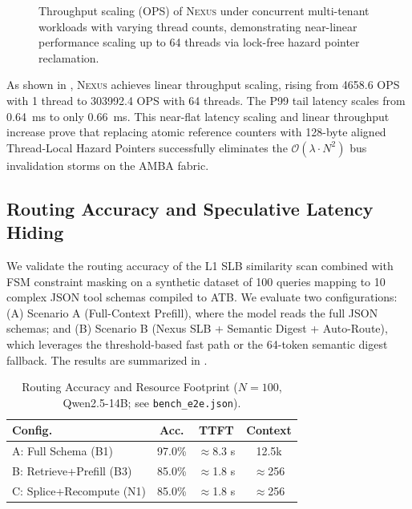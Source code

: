 \documentclass[conference,10pt]{IEEEtran}
\newcommand{\Nexus}{\textsc{Nexus}\xspace}
\begin{document}
\begin{figure}[h]
\centering
{}
\caption{Throughput scaling (OPS) of \Nexus under concurrent multi-tenant workloads with varying thread counts, demonstrating near-linear performance scaling up to 64 threads via lock-free hazard pointer reclamation.}
\label{fig:qps_scaling}
\end{figure}

As shown in , \Nexus achieves linear throughput scaling, rising from \num{4658.6} OPS with 1 thread to \num{303992.4} OPS with 64 threads. The P99 tail latency scales from \SI{0.64}{\milli\second} to only \SI{0.66}{\milli\second}. This near-flat latency scaling and linear throughput increase prove that replacing atomic reference counters with 128-byte aligned Thread-Local Hazard Pointers successfully eliminates the $\mathcal{O}(\lambda \cdot N^2)$ bus invalidation storms on the AMBA fabric.

\subsection{Routing Accuracy and Speculative Latency Hiding}
\label{subsec:eval-accuracy}
We validate the routing accuracy of the L1 SLB similarity scan combined with FSM constraint masking on a synthetic dataset of 100 queries mapping to 10 complex JSON tool schemas compiled to ATB. We evaluate two configurations: (A) Scenario A (Full-Context Prefill), where the model reads the full JSON schemas; and (B) Scenario B (Nexus SLB + Semantic Digest + Auto-Route), which leverages the threshold-based fast path or the 64-token semantic digest fallback. The results are summarized in .

\begin{table}[htbp]
\centering
\caption{Routing Accuracy and Resource Footprint ($N=100$, Qwen2.5-14B; see \texttt{bench\_e2e.json}).}
\label{tab:accuracy}
\small
\begin{tabular}{@{}lccc@{}}
\toprule
\textbf{Config.} & \textbf{Acc.} & \textbf{TTFT} & \textbf{Context} \\ \midrule
A: Full Schema (B1) & 97.0\% & $\approx$8.3 s & 12.5k \\
B: Retrieve+Prefill (B3) & 85.0\% & $\approx$1.8 s & $\approx$256 \\
C: Splice+Recompute (N1) & 85.0\% & $\approx$1.8 s & $\approx$256 \\ \bottomrule
\end{tabular}
\end{table}
\end{document}

